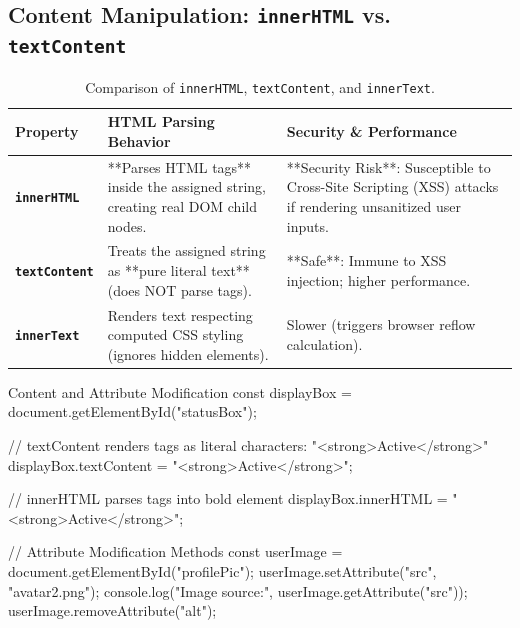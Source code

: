 \subsection{Content Manipulation: \texttt{innerHTML} vs. \texttt{textContent}}

\begin{table}[htbp]
\centering
\small
\renewcommand{\arraystretch}{1.3}
\begin{tabularx}{\linewidth}{l>{\raggedright\arraybackslash}X>{\raggedright\arraybackslash}X}
\toprule
\textbf{Property} & \textbf{HTML Parsing Behavior} & \textbf{Security \& Performance} \\
\midrule
\textbf{\texttt{innerHTML}} & **Parses HTML tags** inside the assigned string, creating real DOM child nodes. & **Security Risk**: Susceptible to Cross-Site Scripting (XSS) attacks if rendering unsanitized user inputs. \\
\textbf{\texttt{textContent}} & Treats the assigned string as **pure literal text** (does NOT parse tags). & **Safe**: Immune to XSS injection; higher performance. \\
\textbf{\texttt{innerText}} & Renders text respecting computed CSS styling (ignores hidden elements). & Slower (triggers browser reflow calculation). \\
\bottomrule
\end{tabularx}
\caption{Comparison of \texttt{innerHTML}, \texttt{textContent}, and \texttt{innerText}.}
\label{tab:content-properties}
\end{table}

\begin{jscode}{Content and Attribute Modification}
const displayBox = document.getElementById("statusBox");

// textContent renders tags as literal characters: "<strong>Active</strong>"
displayBox.textContent = "<strong>Active</strong>";

// innerHTML parses tags into bold element
displayBox.innerHTML = "<strong>Active</strong>";

// Attribute Modification Methods
const userImage = document.getElementById("profilePic");
userImage.setAttribute("src", "avatar2.png");
console.log("Image source:", userImage.getAttribute("src"));
userImage.removeAttribute("alt");
\end{jscode}

